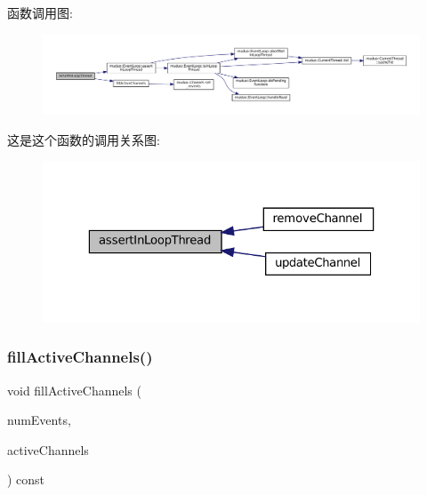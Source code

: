 函数调用图\+:
\nopagebreak
\begin{figure}[H]
\begin{center}
\leavevmode
\includegraphics[width=350pt]{classmuduo_1_1Poller_a9e9c23193ece3ba25a1a2779fc7ebc2d_cgraph}
\end{center}
\end{figure}
这是这个函数的调用关系图\+:
\nopagebreak
\begin{figure}[H]
\begin{center}
\leavevmode
\includegraphics[width=323pt]{classmuduo_1_1Poller_a9e9c23193ece3ba25a1a2779fc7ebc2d_icgraph}
\end{center}
\end{figure}
\mbox{\label{classmuduo_1_1Poller_a93b3d6d6cac94e92c2ddfd91e9b18cc0}} 
\subsubsection{\texorpdfstring{fill\+Active\+Channels()}{fillActiveChannels()}}
{\footnotesize\ttfamily void fill\+Active\+Channels (\begin{DoxyParamCaption}\item[{int}]{num\+Events,  }\item[{\hyperlink{classmuduo_1_1Poller_a0b74248ffee6df294563618187b52404}{Channel\+List} $\ast$}]{active\+Channels }\end{DoxyParamCaption}) const\hspace{0.3cm}{\ttfamily [private]}}




